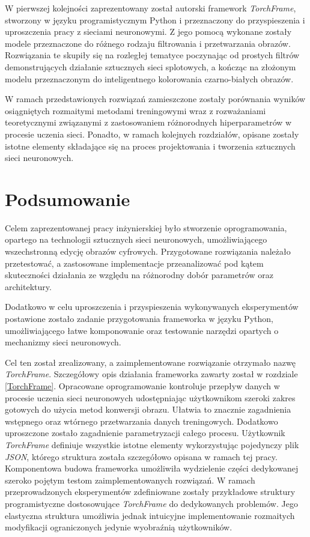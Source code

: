\documentclass[10pt, a4paper, twoside, notitlepage, openright]{article}
\begin{document}
  W pierwszej kolejności zaprezentowany został autorski framework \textit{TorchFrame},
  stworzony w języku programistycznym Python i przeznaczony do przyspieszenia i uproszczenia
  pracy z sieciami neuronowymi. Z jego pomocą wykonane zostały modele przeznaczone
  do różnego rodzaju filtrowania i przetwarzania obrazów. Rozwiązania te
  skupiły się na rozległej tematyce poczynając od prostych filtrów demonstrujących
  działanie sztucznych sieci splotowych, a kończąc na złożonym modelu przeznaczonym do
  inteligentnego kolorowania czarno-białych obrazów.

  W ramach przedstawionych rozwiązań zamieszczone zostały porównania wyników
  osiągniętych rozmaitymi metodami treningowymi wraz z rozważaniami teoretycznymi
  związanymi z zastosowaniem różnorodnych hiperparametrów w procesie uczenia sieci.
  Ponadto, w ramach kolejnych rozdziałów, opisane zostały istotne
  elementy składające się na proces projektowania i tworzenia sztucznych sieci
  neuronowych.

  

  

  

\section{Podsumowanie}

  Celem zaprezentowanej pracy inżynierskiej było stworzenie oprogramowania,
  opartego na technologii sztucznych sieci neuronowych, umożliwiającego
  wszechstronną edycję obrazów cyfrowych. Przygotowane rozwiązania należało
  przetestować, a zastosowane implementacje przeanalizować pod kątem
  skuteczności działania ze względu na różnorodny dobór parametrów oraz
  architektury.

  Dodatkowo w celu uproszczenia i przyspieszenia wykonywanych eksperymentów
  postawione zostało zadanie przygotowania frameworka w języku Python, umożliwiającego
  łatwe komponowanie oraz testowanie narzędzi opartych o mechanizmy sieci
  neuronowych.

  Cel ten został zrealizowany, a zaimplementowane rozwiązanie otrzymało nazwę
  \textit{TorchFrame}. Szczegółowy opis działania frameworka zawarty został w
  rozdziale \ref{TorchFrame}. Opracowane oprogramowanie kontroluje przepływ danych
  w procesie uczenia sieci neuronowych udostępniając użytkownikom szeroki zakres gotowych do
  użycia metod konwersji obrazu. Ułatwia to znacznie zagadnienia
  wstępnego oraz wtórnego przetwarzania danych treningowych. Dodatkowo uproszczone
  zostało zagadnienie parametryzacji całego procesu. Użytkownik \textit{TorchFrame}
  definiuje wszystkie istotne elementy wykorzystując pojedynczy plik \textit{JSON}, którego
  struktura została szczegółowo opisana w ramach tej pracy. Komponentowa budowa
  frameworka umożliwiła wydzielenie części dedykowanej szeroko pojętym testom
  zaimplementowanych rozwiązań. W ramach przeprowadzonych eksperymentów zdefiniowane
  zostały przykładowe struktury programistyczne dostosowujące \textit{TorchFrame}
  do dedykowanych problemów. Jego elastyczna struktura umożliwia jednak
  intuicyjne implementowanie rozmaitych modyfikacji ograniczonych jedynie
  wyobraźnią użytkowników.
\end{document}
